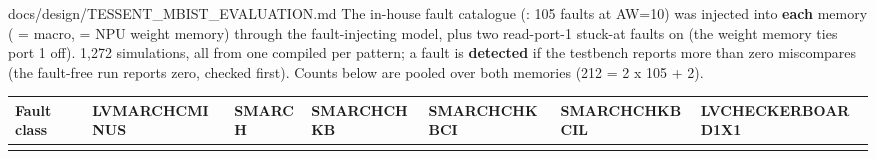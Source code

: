 \begin{relocated}{docs/design/TESSENT_MBIST_EVALUATION.md}
The in-house fault catalogue
(: 105 faults at
AW=10) was injected into \textbf{each} memory ( =
 macro,  = NPU weight memory) through the
fault-injecting model, plus two read-port-1 stuck-at faults on 
(the weight memory ties port 1 off). 1,272 simulations, all from one
compiled  per pattern; a fault is \textbf{detected} if the
testbench reports more than zero miscompares (the fault-free run reports
zero, checked first). Counts below are pooled over both memories (212 =
2 x 105 + 2).

\begin{landscape}
\small\setlength{\tabcolsep}{4pt}

{
\begin{longtable}[]{@{}
  >{\raggedright\arraybackslash}p{}
  >{\raggedright\arraybackslash}p{}
  >{\raggedright\arraybackslash}p{}
  >{\raggedright\arraybackslash}p{}
  >{\raggedright\arraybackslash}p{}
  >{\raggedright\arraybackslash}p{}
  >{\raggedright\arraybackslash}p{}@{}}
\toprule\noalign{}
\begin{minipage}[b]{\linewidth}\raggedright
Fault class
\end{minipage} & \begin{minipage}[b]{\linewidth}\raggedright
LVMARCHCMINUS
\end{minipage} & \begin{minipage}[b]{\linewidth}\raggedright
SMARCH
\end{minipage} & \begin{minipage}[b]{\linewidth}\raggedright
SMARCHCHKB
\end{minipage} & \begin{minipage}[b]{\linewidth}\raggedright
SMARCHCHKBCI
\end{minipage} & \begin{minipage}[b]{\linewidth}\raggedright
SMARCHCHKBCIL
\end{minipage} & \begin{minipage}[b]{\linewidth}\raggedright
LVCHECKERBOARD1X1
\end{minipage} \\
\midrule\noalign{}
\endhead
\bottomrule\noalign{}

\end{longtable}}
\end{landscape}
\end{relocated}
